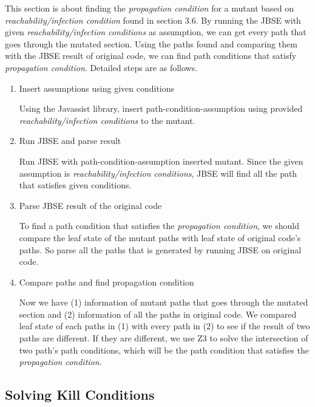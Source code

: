\documentclass{article}
\begin{document}
\fi

This section is about finding the \emph{propagation condition} for a mutant based on \emph{reachability/infection condition} found in section 3.6. By running the JBSE with given \emph{reachability/infection conditions} as assumption, we can get every path that goes through the mutated section. Using the paths found and comparing them with the JBSE result of original code, we can find path conditions that satisfy \emph{propagation condition}. Detailed steps are as follows.

\begin{enumerate}
    \item Insert assumptions using given conditions
    
    Using the Javassist library, insert path-condition-assumption using provided \emph{reachability/infection conditions} to the mutant.
    
    \item Run JBSE and parse result
    
    Run JBSE with path-condition-assumption inserted mutant. Since the given assumption is \emph{reachability/infection conditions}, JBSE will find all the path that satisfies given conditions.
    \item Parse JBSE result of the original code
    
    To find a path condition that satisfies the \emph{propagation condition}, we should compare the leaf state of the mutant paths with leaf state of original code's paths. So parse all the paths that is generated by running JBSE on original code.
    \item Compare paths and find propagation condition
    
    Now we have (1) information of mutant paths that goes through the mutated section and (2) information of all the paths in original code. We compared leaf state of each paths in (1) with every path in (2) to see if the result of two paths are different. If they are different, we use Z3 to solve the intersection of two path's path conditions, which will be the path condition that satisfies the \emph{propagation condition}.
    
    
\end{enumerate}






\subsection{Solving Kill Conditions}
\end{document}
